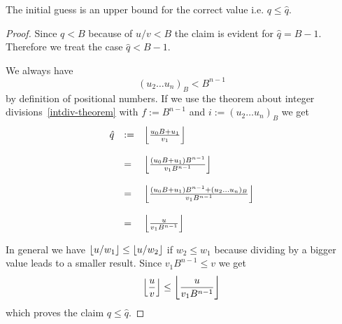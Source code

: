\begin{theorem}
    The initial guess is an upper bound for the correct value i.e. $q \le
    \hat{q}$.

    \begin{proof}
        Since $q < B$ because of $u/v < B$ the claim is evident for $\hat{q} = B
        - 1$. Therefore we treat the case $\hat{q} < B - 1$.

        We always have
        $$
            (u_2 \ldots u_n)_B < B^{n-1}
        $$
        by definition of positional numbers. If we use the theorem about integer
        divisions~\ref{intdiv-theorem} with $f := B^{n-1}$ and $i := (u_2 \ldots
        u_n)_B$ we get
        $$
        \begin{array}{lll}
            \hat{q}
            &:=&
            \left\lfloor \frac{u_0 B + u_1}{v_1} \right\rfloor
            \\
            \\
            &=&
            \left\lfloor \frac{(u_0 B + u_1) B^{n-1}}{v_1 B^{n-1}} \right\rfloor
            \\
            \\
            &=&
            \left\lfloor \frac{(u_0 B + u_1) B^{n-1} + (u_2 \ldots u_n)_B}{v_1 B^{n-1}} \right\rfloor
            \\
            \\
            &=&
            \left\lfloor \frac{u}{v_1 B^{n-1}} \right\rfloor
        \end{array}
        $$

        In general we have $\left\lfloor u / w_1 \right\rfloor \le \left\lfloor u / w_2 \right\rfloor$ if $w_2 \le
        w_1$ because dividing by a bigger value leads to a smaller result. Since
        $v_1 B^{n-1} \le v$ we get
        $$
            \left\lfloor \frac{u}{v} \right\rfloor \le \left\lfloor \frac{u}{v_1 B^{n-1}} \right\rfloor
        $$
        which proves the claim $q \le \hat{q}$.
    \end{proof}
\end{theorem}
